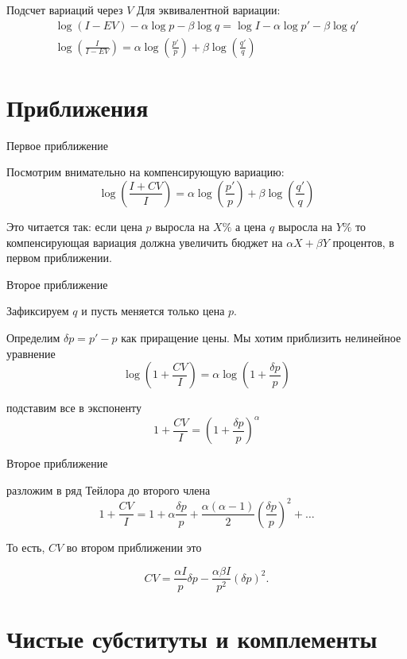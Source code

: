 \documentclass{beamer}
\begin{document}
\begin{frame}{Подсчет вариаций через $V$}
Для эквивалентной вариации:
\begin{gather*}
 \log (I - EV) - \alpha \log p - \beta \log q = \log I - \alpha \log p' - \beta \log q'\\
 \log(\frac{I}{I - EV}) = \alpha \log (\frac{p'}{p}) + \beta \log (\frac{q'}{q})
\end{gather*}

\end{frame}

\section{Приближения}

\begin{frame}{Первое приближение}

Посмотрим внимательно на компенсирующую вариацию:
$$\log(\frac{I+CV}{I}) = \alpha \log (\frac{p'}{p}) + \beta \log (\frac{q'}{q})$$

Это читается так: если цена $p$ выросла на $X \%$ а цена $q$ выросла на $Y \%$ то компенсирующая вариация должна увеличить бюджет на $\alpha X + \beta Y$ процентов, в первом приближении.

\end{frame}

\begin{frame}{Второе приближение}

Зафиксируем $q$ и пусть меняется только цена $p$.

Определим $\delta p = p'-p$ как приращение цены. Мы хотим приблизить нелинейное уравнение
$$\log(1 + \frac{CV}{I}) = \alpha \log (1 + \frac{\delta p}{p})$$

подставим все в экспоненту
$$1 + \frac{CV}{I} = (1 + \frac{\delta p}{p})^{\alpha}$$
\end{frame}

\begin{frame}{Второе приближение}

разложим в ряд Тейлора до второго члена
$$1 + \frac{CV}{I} = 1 + \alpha \frac{\delta p}{p} + \frac{\alpha(\alpha-1)}{2} (\frac{\delta p}{p})^2 + \ldots$$

То есть, $CV$ во втором приближении это

$$CV = \frac{\alpha I}{p} \delta p - \frac{ \alpha \beta I}{p^2} (\delta p)^2.$$
\end{frame}

\section{Чистые субституты и комплементы}
\end{document}
